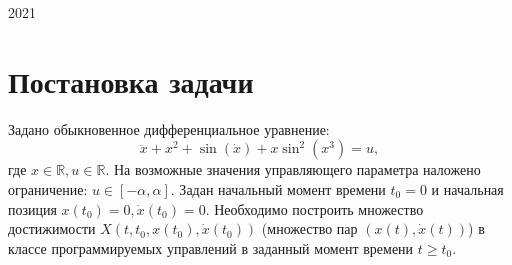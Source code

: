 \documentclass{article}
\theoremstyle{definition}
\begin{document}
		\vspace{5cm}
		
		\begin{center}
		  2021
		\end{center}
		
		\newpage
	
	\newpage
	\tableofcontents
	\newpage
	{\vspace*{-2cm} \hspace*{-1cm}\section{Постановка задачи}}
	{Задано обыкновенное дифференциальное уравнение:}
	\begin{equation}
		\ddot x + x^2 + \sin(\dot x) + x\sin^2(x^3) = u,
	\end{equation}  
	{где $x \in \mathbb{R}, u \in \mathbb{R}.$ На возможные значения управляющего параметра наложено ограничение: $u \in [-\alpha, \alpha].$ Задан начальный момент времени $t_0 = 0$ и начальная позиция $x(t_0) = 0, \dot x(t_0) = 0.$ Необходимо построить множество достижимости $X(t,t_0,x(t_0),\dot x(t_0))$ (множество пар $(x(t), \dot x(t))$) в классе программируемых управлений в заданный момент времени $t \geq t_0$.}
\end{document}
